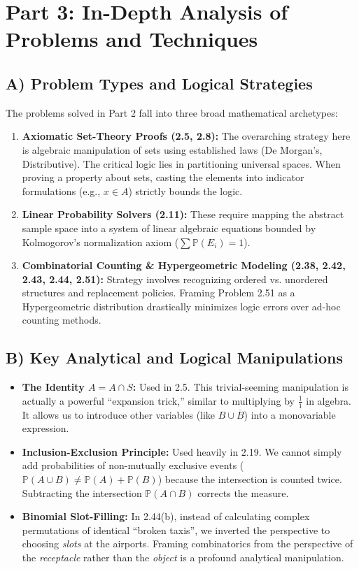 \documentclass[11pt, letterpaper]{article}
\theoremstyle{definition}
\theoremstyle{remark}
\newcommand{\Prob}{\mathbb{P}}
\newcommand{\comp}[1]{\overline{#1}}
\begin{document}
\newpage
\section{Part 3: In-Depth Analysis of Problems and Techniques}

\subsection{A) Problem Types and Logical Strategies}
The problems solved in Part 2 fall into three broad mathematical archetypes:
\begin{enumerate}
    \item \textbf{Axiomatic Set-Theory Proofs (2.5, 2.8):} The overarching strategy here is algebraic manipulation of sets using established laws (De Morgan's, Distributive). The critical logic lies in partitioning universal spaces. When proving a property about sets, casting the elements into indicator formulations (e.g., $x \in A$) strictly bounds the logic.
    \item \textbf{Linear Probability Solvers (2.11):} These require mapping the abstract sample space into a system of linear algebraic equations bounded by Kolmogorov's normalization axiom ($\sum \Prob(E_{i}) = 1$). 
    \item \textbf{Combinatorial Counting \& Hypergeometric Modeling (2.38, 2.42, 2.43, 2.44, 2.51):} Strategy involves recognizing ordered vs. unordered structures and replacement policies. Framing Problem 2.51 as a Hypergeometric distribution drastically minimizes logic errors over ad-hoc counting methods.
\end{enumerate}

\subsection{B) Key Analytical and Logical Manipulations}
\begin{itemize}
    \item \textbf{The Identity $A = A \cap S$:} Used in 2.5. This trivial-seeming manipulation is actually a powerful ``expansion trick,'' similar to multiplying by $\frac{1}{1}$ in algebra. It allows us to introduce other variables (like $B \cup \comp{B}$) into a monovariable expression.
    \item \textbf{Inclusion-Exclusion Principle:} Used heavily in 2.19. We cannot simply add probabilities of non-mutually exclusive events ($\Prob(A \cup B) \ne \Prob(A) + \Prob(B)$) because the intersection is counted twice. Subtracting the intersection $\Prob(A \cap B)$ corrects the measure.
    \item \textbf{Binomial Slot-Filling:} In 2.44(b), instead of calculating complex permutations of identical ``broken taxis'', we inverted the perspective to choosing \textit{slots} at the airports. Framing combinatorics from the perspective of the \textit{receptacle} rather than the \textit{object} is a profound analytical manipulation.
\end{itemize}
\end{document}
